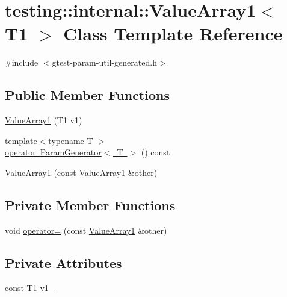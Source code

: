 \hypertarget{classtesting_1_1internal_1_1_value_array1}{}\section{testing\+::internal\+::Value\+Array1$<$ T1 $>$ Class Template Reference}
\label{classtesting_1_1internal_1_1_value_array1}


{\ttfamily \#include $<$gtest-\/param-\/util-\/generated.\+h$>$}

\subsection*{Public Member Functions}
\begin{DoxyCompactItemize}
\item 
\mbox{\hyperlink{classtesting_1_1internal_1_1_value_array1_a8eaffed25a4ddbe790472ca07595a319}{Value\+Array1}} (T1 v1)
\item 
{\footnotesize template$<$typename T $>$ }\\\mbox{\hyperlink{classtesting_1_1internal_1_1_value_array1_a1ffe0a28fd09efa980df1aaa3f7af2a0}{operator Param\+Generator$<$ T $>$}} () const
\item 
\mbox{\hyperlink{classtesting_1_1internal_1_1_value_array1_a54a3968da3354334cb4d730f5254e216}{Value\+Array1}} (const \mbox{\hyperlink{classtesting_1_1internal_1_1_value_array1}{Value\+Array1}} \&other)
\end{DoxyCompactItemize}
\subsection*{Private Member Functions}
\begin{DoxyCompactItemize}
\item 
void \mbox{\hyperlink{classtesting_1_1internal_1_1_value_array1_af2a3cc5b27d7c9bb8ad56eaf09054631}{operator=}} (const \mbox{\hyperlink{classtesting_1_1internal_1_1_value_array1}{Value\+Array1}} \&other)
\end{DoxyCompactItemize}
\subsection*{Private Attributes}
\begin{DoxyCompactItemize}
\item 
const T1 \mbox{\hyperlink{classtesting_1_1internal_1_1_value_array1_ab451e2eaa5ef878e90d83136c50b5432}{v1\+\_\+}}
\end{DoxyCompactItemize}


